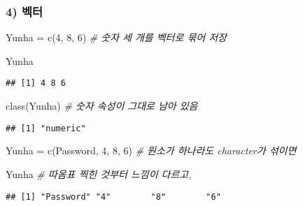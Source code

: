 \documentclass[
  12,
]{article}
\newenvironment{Shaded}{\begin{snugshade}}{\end{snugshade}}
\newcommand{\CommentTok}[1]{\textcolor[rgb]{0.56,0.35,0.01}{\textit{#1}}}
\newcommand{\DecValTok}[1]{\textcolor[rgb]{0.00,0.00,0.81}{#1}}
\newcommand{\FunctionTok}[1]{\textcolor[rgb]{0.00,0.00,0.00}{#1}}
\newcommand{\NormalTok}[1]{#1}
\newcommand{\OtherTok}[1]{\textcolor[rgb]{0.56,0.35,0.01}{#1}}
\newcommand{\StringTok}[1]{\textcolor[rgb]{0.31,0.60,0.02}{#1}}
\begin{document}
\hypertarget{uxbca1uxd130}{%
\subsubsection{4) 벡터}\label{uxbca1uxd130}}

\begin{Shaded}
\begin{Highlighting}[]
\NormalTok{Yunha }\OtherTok{=} \FunctionTok{c}\NormalTok{(}\DecValTok{4}\NormalTok{, }\DecValTok{8}\NormalTok{, }\DecValTok{6}\NormalTok{) }\CommentTok{\# 숫자 세 개를 벡터로 묶어 저장}
\end{Highlighting}
\end{Shaded}

\begin{Shaded}
\begin{Highlighting}[]
\NormalTok{Yunha}
\end{Highlighting}
\end{Shaded}

\begin{verbatim}
## [1] 4 8 6
\end{verbatim}

\begin{Shaded}
\begin{Highlighting}[]
\FunctionTok{class}\NormalTok{(Yunha) }\CommentTok{\# 숫자 속성이 그대로 남아 있음}
\end{Highlighting}
\end{Shaded}

\begin{verbatim}
## [1] "numeric"
\end{verbatim}

\begin{Shaded}
\begin{Highlighting}[]
\NormalTok{Yunha }\OtherTok{=} \FunctionTok{c}\NormalTok{(}\StringTok{\textquotesingle{}Password\textquotesingle{}}\NormalTok{, }\DecValTok{4}\NormalTok{, }\DecValTok{8}\NormalTok{, }\DecValTok{6}\NormalTok{) }\CommentTok{\# 원소가 하나라도 character가 섞이면}
\end{Highlighting}
\end{Shaded}

\begin{Shaded}
\begin{Highlighting}[]
\NormalTok{Yunha }\CommentTok{\# 따옴표 찍힌 것부터 느낌이 다르고,}
\end{Highlighting}
\end{Shaded}

\begin{verbatim}
## [1] "Password" "4"        "8"        "6"
\end{verbatim}
\end{document}
